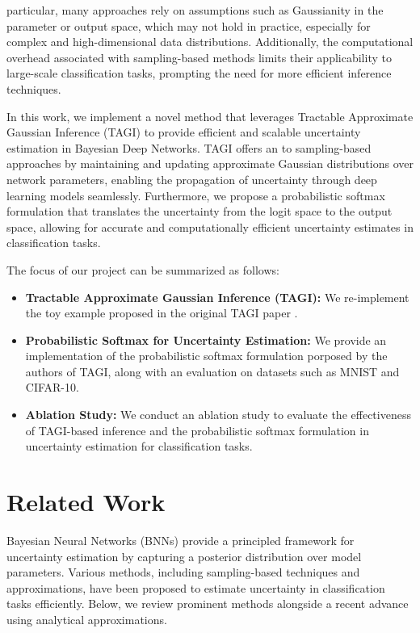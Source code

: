 \documentclass{article}
\begin{document}
particular, many approaches rely on assumptions such as Gaussianity in the parameter or output space, which may not hold in practice, especially for complex and high-dimensional data distributions. Additionally, the computational overhead associated with sampling-based methods limits their applicability to large-scale classification tasks, prompting the need for more efficient inference techniques.

In this work, we implement a novel method that leverages Tractable Approximate Gaussian Inference (TAGI) to provide efficient and scalable uncertainty estimation in Bayesian Deep Networks. TAGI offers an to sampling-based approaches by maintaining and updating approximate Gaussian distributions over network parameters, enabling the propagation of uncertainty through deep learning models seamlessly. Furthermore, we propose a probabilistic softmax formulation that translates the uncertainty from the logit space to the output space, allowing for accurate and computationally efficient uncertainty estimates in classification tasks.

The focus of our project can be summarized as follows:

\begin{itemize}
    \item \textbf{Tractable Approximate Gaussian Inference (TAGI):} We re-implement the toy example proposed in the original TAGI paper \cite{goulet2020tractable}.
    \item \textbf{Probabilistic Softmax for Uncertainty Estimation:} We provide an implementation of the probabilistic softmax formulation porposed by the authors of TAGI, along with an evaluation on datasets such as MNIST and CIFAR-10.
    \item \textbf{Ablation Study:} We conduct an ablation study to evaluate the effectiveness of TAGI-based inference and the probabilistic softmax formulation in uncertainty estimation for classification tasks.
\end{itemize}

\section{Related Work}\label{sec:related_work}
Bayesian Neural Networks (BNNs) provide a principled framework for uncertainty estimation by capturing a posterior distribution over model parameters. Various methods, including sampling-based techniques and approximations, have been proposed to estimate uncertainty in classification tasks efficiently. Below, we review prominent methods alongside a recent advance using analytical approximations.
\end{document}
